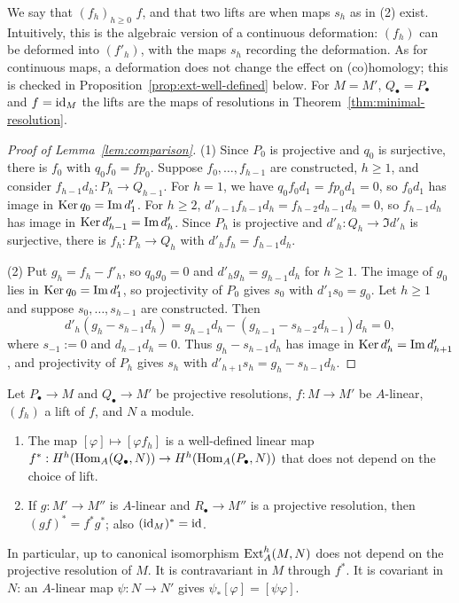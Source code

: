 We say that $(f_h)_{h\geq0}$  $f$, and that two lifts are  when maps $s_h$ as in (2) exist.
Intuitively, this is the algebraic version of a continuous deformation: $(f_h)$ can be deformed into $(f'_h)$, with the maps $s_h$ recording the deformation.
As for continuous maps, a deformation does not change the effect on (co)homology; this is checked in Proposition~\ref{prop:ext-well-defined} below.
For $M=M'$, $Q_\bullet=P_\bullet$ and $f=\operatorname{id}_M$ the lifts are the maps of resolutions in Theorem~\ref{thm:minimal-resolution}.

\begin{supplementary}
\begin{proof}[Proof of Lemma~\ref{lem:comparison}]
(1) Since $P_0$ is projective and $q_0$ is surjective, there is $f_0$ with $q_0f_0=fp_0$.
Suppose $f_0,\ldots,f_{h-1}$ are constructed, $h\geq1$, and consider $f_{h-1}d_h:P_h\to Q_{h-1}$.
For $h=1$, we have $q_0f_0d_1=fp_0d_1=0$, so $f_0d_1$ has image in $\operatorname{Ker}\nolimits q_0=\operatorname{Im}\nolimits d'_1$.
For $h\geq2$, $d'_{h-1}f_{h-1}d_h=f_{h-2}d_{h-1}d_h=0$, so $f_{h-1}d_h$ has image in $\operatorname{Ker}\nolimits d'_{h-1}=\operatorname{Im}\nolimits d'_h$.
Since $P_h$ is projective and $d'_h:Q_h\to\Im d'_h$ is surjective, there is $f_h:P_h\to Q_h$ with $d'_hf_h=f_{h-1}d_h$.

(2) Put $g_h=f_h-f'_h$, so $q_0g_0=0$ and $d'_hg_h=g_{h-1}d_h$ for $h\geq1$.
The image of $g_0$ lies in $\operatorname{Ker}\nolimits q_0=\operatorname{Im}\nolimits d'_1$, so projectivity of $P_0$ gives $s_0$ with $d'_1s_0=g_0$.
Let $h\geq1$ and suppose $s_0,\ldots,s_{h-1}$ are constructed.
Then
\[
d'_h(g_h-s_{h-1}d_h)=g_{h-1}d_h-(g_{h-1}-s_{h-2}d_{h-1})d_h=0,
\]
where $s_{-1}:=0$ and $d_{h-1}d_h=0$.
Thus $g_h-s_{h-1}d_h$ has image in $\operatorname{Ker}\nolimits d'_h=\operatorname{Im}\nolimits d'_{h+1}$, and projectivity of $P_h$ gives $s_h$ with $d'_{h+1}s_h=g_h-s_{h-1}d_h$.
\end{proof}
\end{supplementary}

\begin{proposition}\label{prop:ext-well-defined}
Let $P_\bullet\to M$ and $Q_\bullet\to M'$ be projective resolutions, $f:M\to M'$ be $A$-linear, $(f_h)$ a lift of $f$, and $N$ a module.
\begin{enumerate}
\item The map $[\varphi]\mapsto[\varphi f_h]$ is a well-defined linear map $f^*:H^h(\operatorname{Hom}\nolimits_A(Q_\bullet,N))\to H^h(\operatorname{Hom}\nolimits_A(P_\bullet,N))$ that does not depend on the choice of lift.
\item If $g:M'\to M''$ is $A$-linear and $R_\bullet\to M''$ is a projective resolution, then $(gf)^*=f^*g^*$; also $(\operatorname{id}_M)^*=\operatorname{id}$.
\end{enumerate}
In particular, up to canonical isomorphism $\operatorname{Ext}\nolimits_A^h(M,N)$ does not depend on the projective resolution of $M$.
It is contravariant in $M$ through $f^*$.
It is covariant in $N$: an $A$-linear map $\psi:N\to N'$ gives $\psi_*[\varphi]=[\psi\varphi]$.
\end{proposition}

